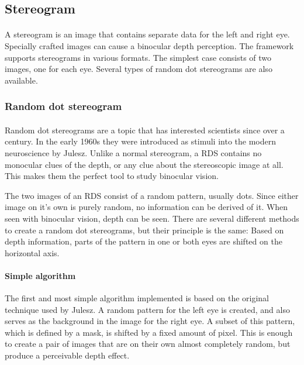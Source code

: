 \subsection{Stereogram\label{Stereogram}}
\paragraph{}
A stereogram is an image that contains separate data for the left and right eye. Specially crafted images can cause a binocular depth perception. The framework supports stereograms in various formats. The simplest case consists of two images, one for each eye. Several types of random dot stereograms are also available.

\subsubsection{Random dot stereogram\label{RDS}}
\paragraph{}
Random dot stereograms are a topic that has interested scientists since over a century\cite{AntRDS}. In the early 1960s they were introduced as stimuli into the modern neuroscience by Julesz\cite{BellRDS}. Unlike a normal stereogram, a RDS contains no monocular clues of the depth, or any clue about the stereoscopic image at all. This makes them the perfect tool to study binocular vision.

The two images of an RDS consist of a random pattern, usually dots. Since either image on it's own is purely random, no information can be derived of it. When seen with binocular vision, depth can be seen. There are several different methods to create a random dot stereograms, but their principle is the same:
Based on depth information, parts of the pattern in one or both eyes are shifted on the horizontal axis.

\paragraph{Simple algorithm}
The first and most simple algorithm implemented is based on the original technique used by Julesz\cite{BellRDS}. A random pattern for the left eye is created, and also serves as the background in the image for the right eye. A subset of this pattern, which is defined by a mask, is shifted by a fixed amount of pixel. This is enough to create a pair of images that are on their own almost completely random, but produce a perceivable depth effect.

